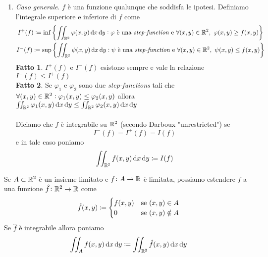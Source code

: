 \begin{definition}
\begin{enumerate}
		\item \emph{Caso generale}. $ f $ è una funzione qualunque che soddisfa le ipotesi. Definiamo l'integrale superiore e inferiore di $ f $ come 
		\begin{gather*}
			I^+(f) \coloneqq \inf{\left\{\iint_{\R^2} \varphi(x, y) \dif{x} \dif{y} : \varphi \text{ è una \emph{step-function} e } \forall (x, y) \in \R^2, \ \varphi(x, y) \geq f(x, y)\right\}} \\
			I^-(f) \coloneqq \sup{\left\{\iint_{\R^2} \psi(x, y) \dif{x} \dif{y} : \psi \text{ è una \emph{step-function} e } \forall (x, y) \in \R^2, \ \psi(x, y) \leq f(x, y)\right\}}
		\end{gather*}
		\textbf{Fatto 1}. $ I^+(f) $ e $ I^-(f) $ esistono sempre e vale la relazione $ I^-(f) \leq I^+(f) $\\
		\textbf{Fatto 2}. Se $ \varphi_1 $ e $ \varphi_2 $ sono due \emph{step-functions} tali che $ \forall (x, y) \in \mathbb{R}^2 : \varphi_1(x, y ) \leq \varphi_2(x, y) $ allora $ \iint_{\R^2} \varphi_1(x, y) \dif{x} \dif{y} \leq \iint_{\R^2} \varphi_2(x, y) \dif{x} \dif{y} $ \\ \\
		Diciamo che $ f $ è integrabile su $ \mathbb{R}^2 $ (secondo Darboux "unrestricted") se 
		\begin{equation*}
			I^-(f) = I^+(f) = I(f)
		\end{equation*}
		e in tale caso poniamo 
		\begin{equation}
			\iint_{\R^2} f(x, y) \dif{x} \dif{y} \coloneqq I(f)
		\end{equation}
	\end{enumerate}
	Se $ A \subset \mathbb{R}^2 $ è un insieme limitato e $ f \colon A \to \mathbb{R} $ è limitata, possiamo estendere $ f $ a una funzione $ \hat{f} \colon \mathbb{R}^2 \to \mathbb{R} $ come 
	\begin{equation*}
		\hat{f}(x, y) \coloneqq 
		\begin{cases}
			f(x, y) & \text{se $ (x, y) \in A$} \\
			0 & \text{se $ (x, y) \notin A $}
		\end{cases}
	\end{equation*}
	Se $ \hat{f} $ è integrabile allora poniamo 
	\begin{equation*}
		\iint_{A} f(x, y) \dif{x} \dif{y} \coloneqq \iint_{\R^2} \hat{f}(x, y) \dif{x} \dif{y}
	\end{equation*}
\end{definition}

